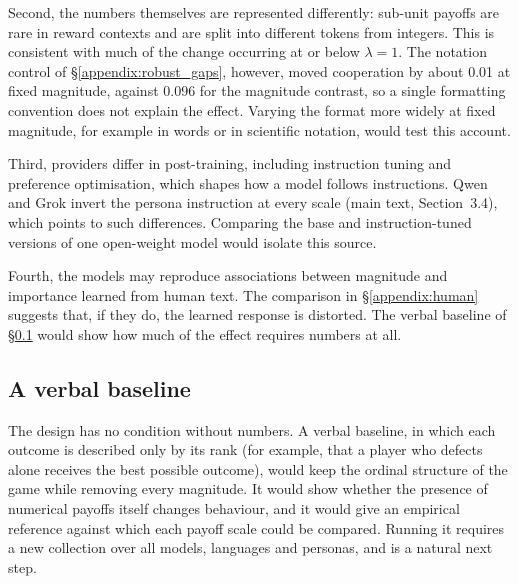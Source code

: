 \documentclass[11pt,a4paper]{article}
\newcommand{\lam}{\lambda}
\begin{document}
{Second, the numbers themselves are represented differently: sub-unit payoffs are rare in reward contexts and are split into different tokens from integers. This is consistent with much of the change occurring at or below $\lam = 1$. The notation control of \S\ref{appendix:robust_gaps}, however, moved cooperation by about 0.01 at fixed magnitude, against 0.096 for the magnitude contrast, so a single formatting convention does not explain the effect. Varying the format more widely at fixed magnitude, for example in words or in scientific notation, would test this account.

Third, providers differ in post-training, including instruction tuning and preference optimisation, which shapes how a model follows instructions. Qwen and Grok invert the persona instruction at every scale (main text, Section~3.4), which points to such differences. Comparing the base and instruction-tuned versions of one open-weight model would isolate this source.

Fourth, the models may reproduce associations between magnitude and importance learned from human text. The comparison in \S\ref{appendix:human} suggests that, if they do, the learned response is distorted. The verbal baseline of \S\ref{appendix:verbal} would show how much of the effect requires numbers at all.

\subsection{A verbal baseline}\label{appendix:verbal}

The design has no condition without numbers. A verbal baseline, in which each outcome is described only by its rank (for example, that a player who defects alone receives the best possible outcome), would keep the ordinal structure of the game while removing every magnitude. It would show whether the presence of numerical payoffs itself changes behaviour, and it would give an empirical reference against which each payoff scale could be compared. Running it requires a new collection over all models, languages and personas, and is a natural next step.}



\end{document}
